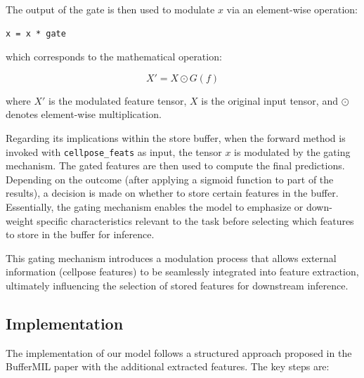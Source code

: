 \documentclass[10pt,twocolumn]{article}
\begin{document}
The output of the gate is then used to modulate \( x \) via an element-wise operation:

\begin{verbatim}
x = x * gate
\end{verbatim}

which corresponds to the mathematical operation:

\[
X' = X \odot G(f)
\]

where \( X' \) is the modulated feature tensor, \( X \) is the original input tensor, and \( \odot \) denotes element-wise multiplication.

Regarding its implications within the store buffer, when the forward method is invoked with \texttt{cellpose\_feats} as input, the tensor \( x \) is modulated by the gating mechanism. The gated features are then used to compute the final predictions. Depending on the outcome (after applying a sigmoid function to part of the results), a decision is made on whether to store certain features in the buffer. Essentially, the gating mechanism enables the model to emphasize or down-weight specific characteristics relevant to the task before selecting which features to store in the buffer for inference.

This gating mechanism introduces a modulation process that allows external information (cellpose features) to be seamlessly integrated into feature extraction, ultimately influencing the selection of stored features for downstream inference.


\subsection{Implementation}

The implementation of our model follows a structured approach proposed in the BufferMIL paper with the additional extracted features. The key steps are:
\end{document}
